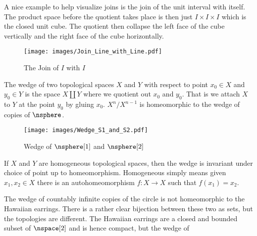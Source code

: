 \documentclass{book}                                                           %
\begin{document}
                \begin{example}
                    A nice example to help visualize joins is the join of the
                    unit interval with itself. The product space before the
                    quotient takes place is then just $I\times{I}\times{I}$
                    which is the closed unit cube. The quotient then collapse
                    the left face of the cube vertically and the right face of
                    the cube horizontally.
                \end{example}
                \begin{figure}
                    \centering
                    \captionsetup{type=figure}
                    \texttt{[image: images/Join\_Line\_with\_Line.pdf]}
                    \caption{The Join of $I$ with $I$}
                    \label{fig:Join_Line_with_Line}
                \end{figure}
                The wedge of two topological spaces $X$ and $Y$ with respect to
                point $x_{0}\in{X}$ and $y_{0}\in{Y}$ is the space
                $X\coprod{Y}$ where we quotient out $x_{0}$ and $y_{0}$. That is
                we attach $X$ to $Y$ at the point $y_{0}$ by gluing $x_{0}$.
                $X^{n}/X^{n-1}$ is homeomorphic to the wedge of copies of
                $\nsphere$.
                \begin{figure}[H]
                    \centering
                    \captionsetup{type=figure}
                    \texttt{[image: images/Wedge\_S1\_and\_S2.pdf]}
                    \caption{Wedge of $\nsphere[1]$ and $\nsphere[2]$}
                    \label{fig:Wedge_S1_and_S2}
                \end{figure}
                If $X$ and $Y$ are homogeneous topological spaces, then the
                wedge is invariant under choice of point up to homeomorphism.
                Homogeneous simply means given $x_{1},x_{2}\in{X}$ there is an
                autohomeomorphism $f:X\rightarrow{X}$ such that
                $f(x_{1})=x_{2}$.
                \par\hfill\par
                The wedge of countably infinite copies of the circle is not
                homeomorphic to the Hawaiian earrings. There is a rather clear
                bijection between these two as sets, but the topologies are
                different. The Hawaiian earrings are a closed and bounded subset
                of $\nspace[2]$ and is hence compact, but the wedge of
\end{document}
